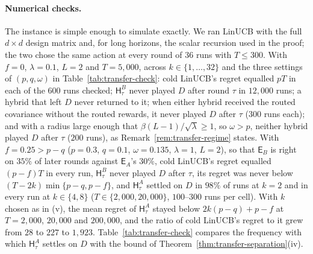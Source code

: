 \documentclass[anon]{alt2027} %
\newcommand{\Exp}{\mathsf{E}}
\newcommand{\Hyb}{\mathsf{H}}
\begin{document}
\paragraph{Numerical checks.}
The instance is simple enough to simulate exactly. We ran LinUCB with the full
$d\times d$ design matrix and, for long horizons, the scalar recursion used in
the proof; the two chose the same action at every round of $36$ runs with
$T\le300$. With $f=0$, $\lambda=0.1$, $L=2$ and $T=5{,}000$, across $k\in\{1,\dots,32\}$
and the three settings of $(p,q,\omega)$ in Table~\ref{tab:transfer-check}: cold
LinUCB's regret equalled $pT$ in each of the $600$ runs checked;
$\Hyb^B_\tau$ never played $D$ after round $\tau$ in $12{,}000$ runs; a hybrid
that left $D$ never returned to it; when either hybrid received the routed
covariance without the routed rewards, it never played $D$ after $\tau$
($300$ runs each); and with a radius large enough that
$\beta(L-1)/\sqrt\lambda\ge1$, so $\omega>p$, neither hybrid played $D$
after $\tau$ ($200$ runs), as Remark~\ref{rem:transfer-regime} states. With
$f=0.25>p-q$ ($p=0.3$, $q=0.1$, $\omega=0.135$, $\lambda=1$, $L=2$), so that
$\Exp_B$ is right on $35\%$ of later rounds against $\Exp_A$'s $30\%$, cold
LinUCB's regret equalled $(p-f)T$ in every run, $\Hyb^B_\tau$ never played $D$
after $\tau$, its regret was never below $(T-2k)\min\{p-q,p-f\}$, and
$\Hyb^A_\tau$ settled on $D$ in $98\%$ of runs at $k=2$ and in every run at
$k\in\{4,8\}$ ($T\in\{2{,}000,20{,}000\}$, $100$--$300$ runs per cell). With $k$
chosen as in (v), the mean regret of $\Hyb^A_\tau$ stayed below
$2k(p-q)+p-f$ at $T=2{,}000$, $20{,}000$ and $200{,}000$, and the ratio of
cold LinUCB's regret to it grew from $28$ to $227$ to $1{,}923$.
Table~\ref{tab:transfer-check} compares the frequency with which
$\Hyb^A_\tau$ settles on $D$ with the bound of
Theorem~\ref{thm:transfer-separation}(iv).
\end{document}
